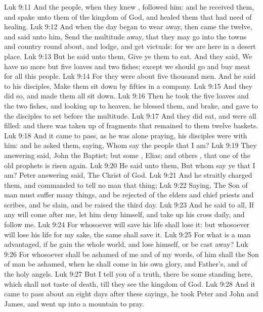 \vs Luk 9:11 And the people, when they knew , followed him: and he received them, and spake unto them of the kingdom of God, and healed them that had need of healing.
\vs Luk 9:12 And when the day began to wear away, then came the twelve, and said unto him, Send the multitude away, that they may go into the towns and country round about, and lodge, and get victuals: for we are here in a desert place.
\vs Luk 9:13 But he said unto them, Give ye them to eat. And they said, We have no more but five loaves and two fishes; except we should go and buy meat for all this people.
\vs Luk 9:14 For they were about five thousand men. And he said to his disciples, Make them sit down by fifties in a company.
\vs Luk 9:15 And they did so, and made them all sit down.
\vs Luk 9:16 Then he took the five loaves and the two fishes, and looking up to heaven, he blessed them, and brake, and gave to the disciples to set before the multitude.
\vs Luk 9:17 And they did eat, and were all filled: and there was taken up of fragments that remained to them twelve baskets.
\vs Luk 9:18 And it came to pass, as he was alone praying, his disciples were with him: and he asked them, saying, Whom say the people that I am?
\vs Luk 9:19 They answering said, John the Baptist; but some , Elias; and others , that one of the old prophets is risen again.
\vs Luk 9:20 He said unto them, But whom say ye that I am? Peter answering said, The Christ of God.
\vs Luk 9:21 And he straitly charged them, and commanded  to tell no man that thing;
\vs Luk 9:22 Saying, The Son of man must suffer many things, and be rejected of the elders and chief priests and scribes, and be slain, and be raised the third day.
\vs Luk 9:23 And he said to  all, If any  will come after me, let him deny himself, and take up his cross daily, and follow me.
\vs Luk 9:24 For whosoever will save his life shall lose it: but whosoever will lose his life for my sake, the same shall save it.
\vs Luk 9:25 For what is a man advantaged, if he gain the whole world, and lose himself, or be cast away?
\vs Luk 9:26 For whosoever shall be ashamed of me and of my words, of him shall the Son of man be ashamed, when he shall come in his own glory, and  Father's, and of the holy angels.
\vs Luk 9:27 But I tell you of a truth, there be some standing here, which shall not taste of death, till they see the kingdom of God.
\vs Luk 9:28 And it came to pass about an eight days after these sayings, he took Peter and John and James, and went up into a mountain to pray.
